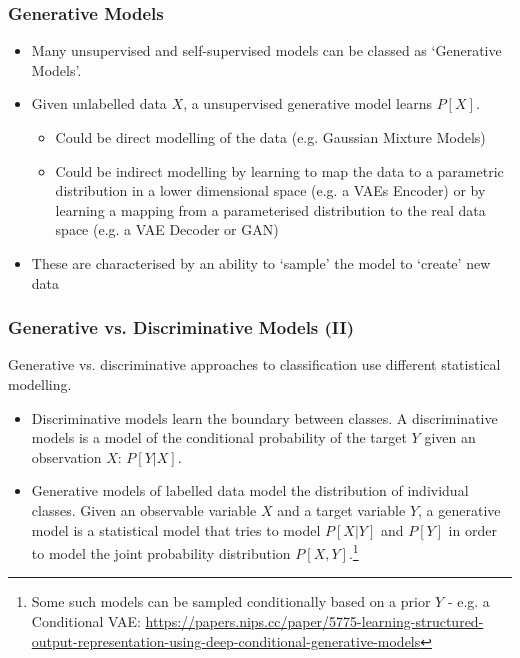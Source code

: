 \documentclass[\beamerclass]{beamer}
\begin{document}
\begin{frame}[fragile]\frametitle{Generative Models}
\begin{itemize}
  \item Many unsupervised and self-supervised models can be classed as `Generative Models'.
  \item Given unlabelled data $X$, a unsupervised generative model learns $P[X]$.
  \begin{itemize}
    \item Could be direct modelling of the data (e.g. Gaussian Mixture Models)
    \item Could be indirect modelling by learning to map the data to a parametric distribution in a lower dimensional space (e.g. a VAEs Encoder) or by learning a mapping from a parameterised distribution to the real data space (e.g. a VAE Decoder or GAN)
  \end{itemize}
  \item These are characterised by an ability to `sample' the model to `create' new data
\end{itemize}
\end{frame}


\begin{frame}[fragile]\frametitle{Generative vs. Discriminative Models (II)}
Generative vs. discriminative approaches to classification use different statistical modelling.
\begin{itemize}
\item Discriminative models learn the boundary between classes. A discriminative models is a model of the conditional probability of the target $Y$ given an observation $X$: $P[Y|X]$.
\item Generative models of labelled data model the distribution of individual classes. Given an observable variable $X$ and a target variable $Y$, a generative model is a statistical model that tries to model $P[X|Y]$ and $P[Y]$ in order to model the joint probability distribution $P[X, Y]$.\footnote{Some such models can be sampled conditionally based on a prior $Y$ - e.g. a Conditional VAE: \url{https://papers.nips.cc/paper/5775-learning-structured-output-representation-using-deep-conditional-generative-models}}
\end{itemize} 

\end{frame}
\end{document}
